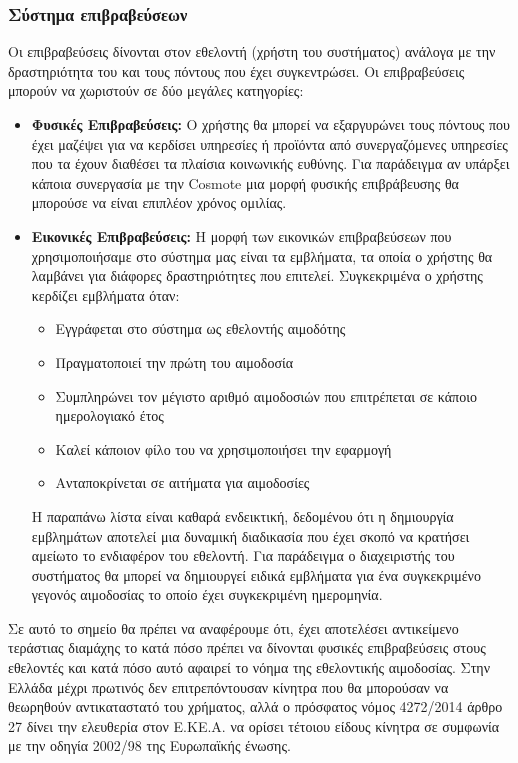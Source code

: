 	\subsubsection{Σύστημα επιβραβεύσεων}
	Οι επιβραβεύσεις δίνονται στον εθελοντή (χρήστη του συστήματος) ανάλογα με την δραστηριότητα του και τους πόντους που έχει συγκεντρώσει. Οι επιβραβεύσεις μπορούν να χωριστούν σε δύο μεγάλες κατηγορίες:
	\begin{itemize}
		\item \textbf{Φυσικές Επιβραβεύσεις:} Ο χρήστης θα μπορεί να εξαργυρώνει τους πόντους που έχει μαζέψει για να κερδίσει υπηρεσίες ή προϊόντα από συνεργαζόμενες υπηρεσίες που τα έχουν διαθέσει τα πλαίσια κοινωνικής ευθύνης. Για παράδειγμα αν υπάρξει κάποια συνεργασία με την Cosmote μια μορφή φυσικής επιβράβευσης θα μπορούσε να είναι επιπλέον χρόνος ομιλίας.
		 \item \textbf{Εικονικές Επιβραβεύσεις:} Η μορφή των εικονικών επιβραβεύσεων που χρησιμοποιήσαμε στο σύστημα μας είναι τα εμβλήματα, τα οποία ο χρήστης θα λαμβάνει για διάφορες δραστηριότητες που επιτελεί. Συγκεκριμένα ο χρήστης κερδίζει εμβλήματα όταν:
		 	\begin{itemize}
		 		\item Εγγράφεται στο σύστημα ως εθελοντής αιμοδότης
		 		\item Πραγματοποιεί την πρώτη του αιμοδοσία
		 		\item Συμπληρώνει τον μέγιστο αριθμό αιμοδοσιών που επιτρέπεται σε κάποιο ημερολογιακό έτος
		 		\item Καλεί κάποιον φίλο του να χρησιμοποιήσει την εφαρμογή
		 		\item Ανταποκρίνεται σε αιτήματα για αιμοδοσίες
		 	\end{itemize}
		 	Η παραπάνω λίστα είναι καθαρά ενδεικτική, δεδομένου ότι η δημιουργία εμβλημάτων αποτελεί μια δυναμική διαδικασία που έχει σκοπό να κρατήσει αμείωτο το ενδιαφέρον του εθελοντή. Για παράδειγμα ο διαχειριστής του συστήματος θα μπορεί να δημιουργεί ειδικά εμβλήματα για ένα συγκεκριμένο γεγονός αιμοδοσίας το οποίο έχει συγκεκριμένη ημερομηνία.
	\end{itemize}
	
	Σε αυτό το σημείο θα πρέπει να αναφέρουμε ότι, έχει αποτελέσει αντικείμενο τεράστιας διαμάχης το κατά πόσο πρέπει να δίνονται φυσικές επιβραβεύσεις στους εθελοντές και κατά πόσο αυτό αφαιρεί το νόημα της εθελοντικής αιμοδοσίας. Στην Ελλάδα μέχρι πρωτινός δεν επιτρεπόντουσαν κίνητρα που θα μπορούσαν να θεωρηθούν αντικαταστατό του χρήματος, αλλά ο πρόσφατος νόμος 4272/2014 άρθρο 27 δίνει την ελευθερία στον Ε.ΚΕ.Α. να ορίσει τέτοιου είδους κίνητρα σε συμφωνία με την οδηγία 2002/98 της Ευρωπαϊκής ένωσης.
	
